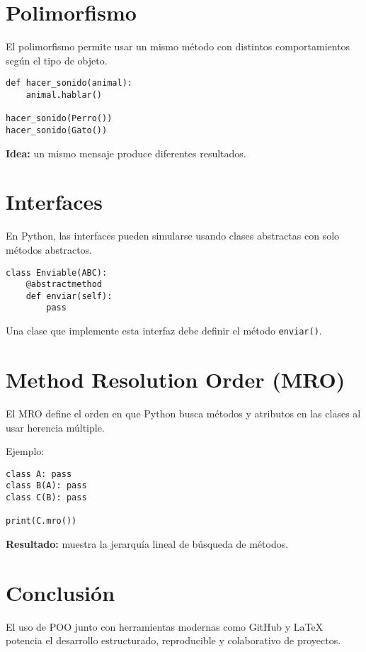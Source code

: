 \documentclass[12pt]{article}
\begin{document}
\section{Polimorfismo}
El polimorfismo permite usar un mismo método con distintos comportamientos según el tipo de objeto.  
\begin{verbatim}
def hacer_sonido(animal):
    animal.hablar()

hacer_sonido(Perro())
hacer_sonido(Gato())
\end{verbatim}

\textbf{Idea:} un mismo mensaje produce diferentes resultados.

\section{Interfaces}
En Python, las interfaces pueden simularse usando clases abstractas con solo métodos abstractos.  
\begin{verbatim}
class Enviable(ABC):
    @abstractmethod
    def enviar(self):
        pass
\end{verbatim}

Una clase que implemente esta interfaz debe definir el método \texttt{enviar()}.

\section{Method Resolution Order (MRO)}
El MRO define el orden en que Python busca métodos y atributos en las clases al usar herencia múltiple.

Ejemplo:
\begin{verbatim}
class A: pass
class B(A): pass
class C(B): pass

print(C.mro())
\end{verbatim}

\textbf{Resultado:} muestra la jerarquía lineal de búsqueda de métodos.

\section{Conclusión}
El uso de POO junto con herramientas modernas como GitHub y \LaTeX{} potencia el desarrollo estructurado, reproducible y colaborativo de proyectos.
\end{document}
